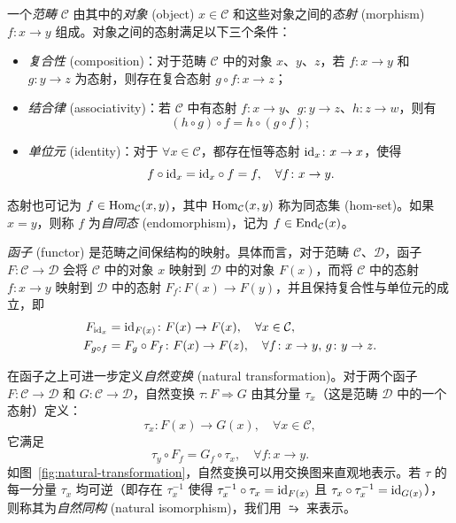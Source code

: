 一个\emph{范畴} $\mathcal{C}$ 由其中的\emph{对象} (object) $x\in\mathcal{C}$ 和这些对象之间的\emph{态射} (morphism) $f\colon x\to y$ 组成。对象之间的态射满足以下三个条件：
\begin{itemize}
  \item \emph{复合性} (composition)：对于范畴 $\mathcal{C}$ 中的对象 $x$、$y$、$z$，若 $f\colon x\to y$ 和 $g\colon y\to z$ 为态射，则存在复合态射 $g\circ f\colon x\to z$；
  \item \emph{结合律} (associativity)：若 $\mathcal{C}$ 中有态射 $f\colon x\to y$、$g\colon y\to z$、$h\colon z\to w$，则有
    \begin{equation}
      (h\circ g)\circ f = h\circ (g\circ f);
    \end{equation}
  \item \emph{单位元} (identity)：对于 $\forall x\in\mathcal{C}$，都存在恒等态射 $\mathrm{id}_x\colon x\to x$，使得
    \begin{equation}
      f \circ \mathrm{id}_x = \mathrm{id}_x \circ f = f, \quad \forall f\colon x\to y.
    \end{equation}
\end{itemize}
态射也可记为 $f\in\operatorname{Hom}_{\mathcal{C}}(x,y)$，其中 $\operatorname{Hom}_{\mathcal{C}}(x,y)$ 称为同态集 (hom-set)。如果 $x=y$，则称 $f$ 为\emph{自同态} (endomorphism)，记为 $f\in\operatorname{End}_{\mathcal{C}}(x)$。

\emph{函子} (functor) 是范畴之间保结构的映射。具体而言，对于范畴 $\mathcal{C}$、$\mathcal{D}$，函子 $F\colon\mathcal{C}\to\mathcal{D}$ 会将 $\mathcal{C}$ 中的对象 $x$ 映射到 $\mathcal{D}$ 中的对象 $F(x)$，而将 $\mathcal{C}$ 中的态射 $f\colon x\to y$ 映射到 $\mathcal{D}$ 中的态射 $F_f\colon F(x)\to F(y)$，并且保持复合性与单位元的成立，即
\begin{align}
  F_{\mathrm{id}_x} &= \mathrm{id}_{F(x)} \colon F(x) \to F(x), \quad \forall x\in\mathcal{C}, \\
  F_{g\circ f} &= F_g \circ F_f \colon F(x) \to F(z), \quad \forall f\colon x\to y, \, g\colon y\to z.
\end{align}

在函子之上可进一步定义\emph{自然变换} (natural transformation)。对于两个函子 $F\colon\mathcal{C}\to\mathcal{D}$ 和 $G\colon\mathcal{C}\to\mathcal{D}$，自然变换 $\tau\colon F\Rightarrow G$ 由其分量 $\tau_x$（这是范畴 $\mathcal{D}$ 中的一个态射）定义：
\begin{equation}
  \tau_x\colon F(x)\to G(x), \quad \forall x\in\mathcal{C},
\end{equation}
它满足
\begin{equation}
  \tau_y \circ F_f = G_f \circ \tau_x, \quad \forall f\colon x\to y.
\end{equation}
如图~\ref{fig:natural-transformation}，自然变换可以用交换图来直观地表示。若 $\tau$ 的每一分量 $\tau_x$ 均可逆（即存在 $\tau_x^{-1}$ 使得 $\tau^{-1}_x\circ\tau_x=\mathrm{id}_{F(x)}$ 且 $\tau_x\circ\tau^{-1}_x = \mathrm{id}_{G(x)}$），则称其为\emph{自然同构} (natural isomorphism)，我们用 $\similarrightarrow$ 来表示。

